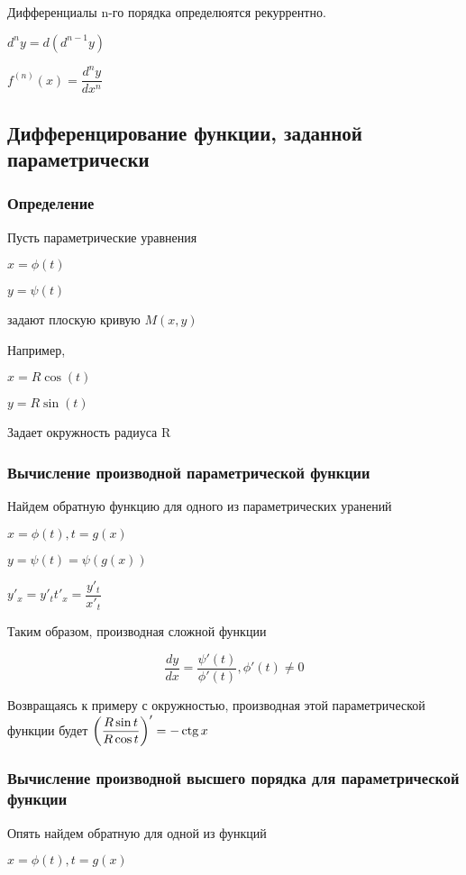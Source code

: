 Дифференциалы n-го порядка определюятся рекуррентно.

$ d^{n}y = d(d^{n-1}y) $	

$ f^{(n)}(x) = \dfrac{d^{n}y}{dx^{n}} $

\subsection{Дифференцирование функции, заданной параметрически}


\subsubsection{Определение}

Пусть параметрические уравнения

$ x = \phi(t) $

$ y = \psi(t) $

задают плоскую кривую $ M(x,y) $

Например,

$ x = R \cos(t) $

$ y = R \sin(t) $

Задает окружность радиуса R

\subsubsection{Вычисление производной параметрической функции}

Найдем обратную функцию для одного из параметрических уранений

$ x = \phi(t), t = g(x) $

$ y = \psi(t) = \psi( g(x) ) $

$ y'_{x} = y'_{t} t'_{x} = \dfrac{y'_{t}}{x'_{t}} $

Таким образом, производная сложной функции

$$ 
\dfrac{dy}{dx} = \dfrac{\psi'(t)}{\phi'(t)}, \phi'(t) \ne 0
$$

Возвращаясь к примеру с окружностью, производная этой параметрической функции будет 
$ \left( \dfrac{R \sin t}{R \cos t} \right)' =  -\operatorname{ctg} x $

\subsubsection{Вычисление производной высшего порядка для параметрической функции}

Опять найдем обратную для одной из функций

$ x = \phi(t), t = g(x) $

